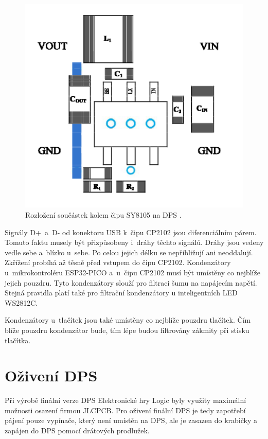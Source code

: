   \begin{figure}[!h]
    \begin{center}
      \includegraphics[scale=1]{obrazky/SY8105_rozlozeni_na_DPS.png}
    \end{center}
    \caption[Rozložení součástek kolem čipu SY8105 na DPS \cite{SY8105_datasheet}]{Rozložení součástek kolem čipu SY8105 na DPS 
    \cite{SY8105_datasheet}.}
  \end{figure}

  Signály D+~a~D- od konektoru USB k~čipu CP2102 jsou diferenciálním párem. Tomuto faktu musely být přizpůsobeny i~dráhy těchto signálů. Dráhy 
  jsou vedeny vedle sebe a~blízko u~sebe. Po celou jejich délku se nepřibližují ani neoddalují. Zkřížení probíhá až těsně před vstupem do čipu CP2102.
  Kondenzátory u~mikrokontroléru ESP32-PICO a~u~čipu CP2102 musí být umístěny co nejblíže jejich pouzdru. Tyto kondenzátory slouží pro 
  filtraci šumu na napájecím napětí. Stejná pravidla platí také pro filtrační kondenzátory u inteligentních LED WS2812C.

  Kondenzátory u~tlačítek jsou také umístěny co nejblíže pouzdru tlačítek. Čím blíže pouzdru kondenzátor bude, tím lépe budou 
  filtrovány zákmity při stisku tlačítka.

  \chapter{Oživení DPS}
  Při výrobě finální verze DPS Elektronické hry Logic byly využity maximální možnosti osazení firmou JLCPCB.  
  Pro oživení finální DPS je tedy zapotřebí pájení pouze vypínače, který není umístěn na DPS, ale je zasazen do krabičky a zapájen
  do DPS pomocí drátových prodlužek. 

